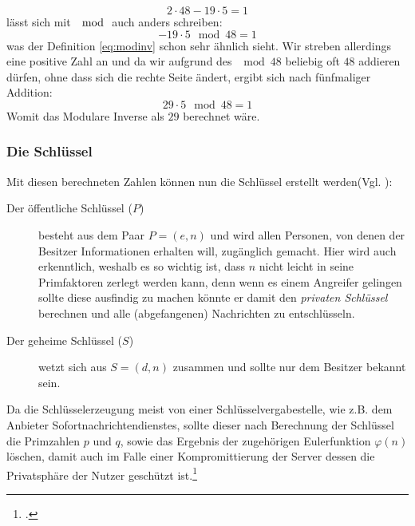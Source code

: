 \documentclass{scrarticle} %
\begin{document}
            \begin{equation}
                2\cdot48-19\cdot5=1
            \end{equation}
            lässt sich mit $\mod$ auch anders schreiben: %
            \begin{equation}
                -19\cdot5\mod{48}=1
            \end{equation}
            was der Definition \ref{eq:modinv} schon sehr ähnlich sieht. Wir streben allerdings eine positive Zahl an und da wir aufgrund des $\mod{48}$ beliebig oft $48$ addieren dürfen, ohne dass sich die rechte Seite ändert, ergibt sich nach fünfmaliger Addition:
            \begin{equation}
                29\cdot5\mod{48} = 1
            \end{equation}
            Womit das Modulare Inverse als $29$ berechnet wäre.



        \subsubsection{Die Schlüssel}
            Mit diesen berechneten Zahlen können nun die Schlüssel erstellt werden(Vgl. \cite[77]{ertel2003}):
            \begin{description}
                \item[Der öffentliche Schlüssel ($P$)] besteht aus dem Paar $P=(e, n)$ und wird allen Personen, von denen der Besitzer Informationen erhalten will, zugänglich gemacht. Hier wird auch erkenntlich, weshalb es so wichtig ist, dass $n$ nicht leicht in seine Primfaktoren zerlegt werden kann, denn wenn es einem Angreifer gelingen sollte diese ausfindig zu machen könnte er damit den \emph{privaten Schlüssel} berechnen und alle (abgefangenen) Nachrichten zu entschlüsseln.
                \item[Der geheime Schlüssel ($S$)] wetzt sich aus $S=(d, n)$ zusammen und sollte nur dem Besitzer bekannt sein. 
            \end{description}
            Da die Schlüsselerzeugung meist von einer Schlüsselvergabestelle, wie z.B. dem Anbieter Sofortnachrichtendienstes, sollte dieser nach Berechnung der Schlüssel die Primzahlen $p$ und $q$, sowie das Ergebnis der zugehörigen Eulerfunktion $\varphi(n)$ löschen, damit auch im Falle einer Kompromittierung der Server dessen die Privatsphäre der Nutzer geschützt ist.\footcite[279]{dankmeier2006} %
\end{document}
